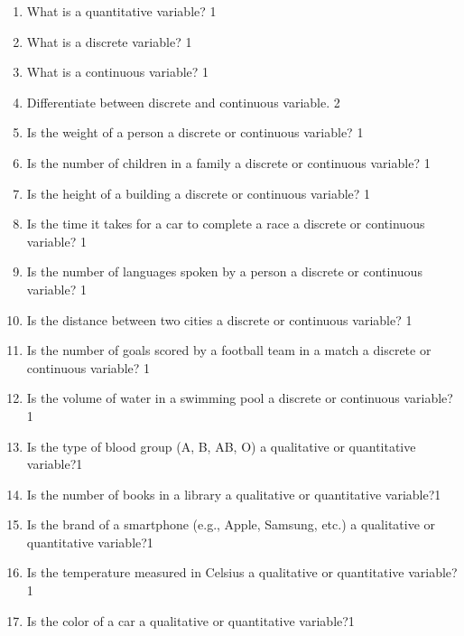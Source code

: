 \documentclass[a4paper,oneside]{book}
\begin{document}
\begin{enumerate}
\item What is a quantitative variable? \hfill 1

\item What is a discrete variable? \hfill 1

\item What is a continuous variable? \hfill 1

\item Differentiate between discrete and continuous variable. \hfill 2
\item Is the weight of a person a discrete or continuous variable? \hfill 1

\item Is the number of children in a family a discrete or continuous variable? \hfill 1

\item Is the height of a building a discrete or continuous variable? \hfill 1

\item Is the time it takes for a car to complete a race a discrete or continuous variable? \hfill 1

\item Is the number of languages spoken by a person a discrete or continuous variable? \hfill 1

\item Is the distance between two cities a discrete or continuous variable? \hfill 1


\item Is the number of goals scored by a football team in a match a discrete 
or continuous variable? \hfill 1

\item Is the volume of water in a swimming pool a discrete or continuous 
variable? \hfill 1

\item Is the type of blood group (A, B, AB, O) a qualitative or 
quantitative variable?\hfill 1

\item Is the number of books in a library a qualitative or quantitative 
variable?\hfill 1

\item Is the brand of a smartphone (e.g., Apple, Samsung, etc.) 
a qualitative or quantitative variable?\hfill 1

\item Is the temperature measured in Celsius a qualitative or quantitative variable?\hfill 1

\item Is the color of a car a qualitative or quantitative variable?\hfill 1


\end{enumerate}
\end{document}
